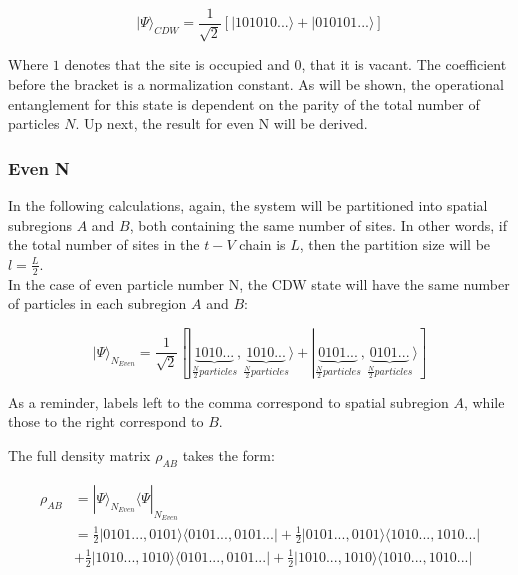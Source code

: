 \[| \Psi \rangle_{CDW} = \frac{1}{\sqrt{2}} [|101010... \rangle + |010101... \rangle ] \]

Where $1$ denotes that the site is occupied and $0$, that it is vacant. The coefficient before the bracket is a normalization constant. As will be shown, the operational entanglement for this state is dependent on the parity of the total number of particles $N$. Up next, the result for even N will be derived.

\begin{samepage}
	\subsubsection{Even N}
	In the following calculations, again, the system will be partitioned into spatial subregions $A$ and $B$, both containing the same number of sites. In other words, if the total number of sites in the $t-V$ chain is $L$, then the partition size will be $l=\frac{L}{2}$. \\
	
In the case of even particle number N, the CDW state will have the same number of particles in each subregion $A$ and $B$:

\begin{equation}
| \Psi \rangle_{N_{Even}} = \frac{1}{\sqrt{2}} [|\underbrace{1010...}_{\frac{N}{2} particles}, \underbrace{1010...}_{\frac{N}{2} particles} \rangle + |\underbrace{0101...}_{\frac{N}{2} particles}, \underbrace{0101...}_{\frac{N}{2} particles} \rangle ] 
\end{equation}

As a reminder, labels left to the comma correspond to spatial subregion $A$, while those to the right correspond to $B$.

The full density matrix $\rho_{AB}$ takes the form:

\begin{equation}
\begin{aligned}
\rho_{AB} &= | \Psi \rangle_{N_{Even}} \langle \Psi |_{N_{Even}} \\
&= \frac{1}{2} |0101...,0101\rangle \langle 0101...,0101... | + \frac{1}{2} |0101...,0101\rangle \langle 1010...,1010... |  \\
&+ \frac{1}{2} |1010...,1010\rangle \langle 0101...,0101... | + \frac{1}{2} |1010...,1010\rangle \langle 1010...,1010... |  \\
\end{aligned}
\end{equation}


\end{samepage}
